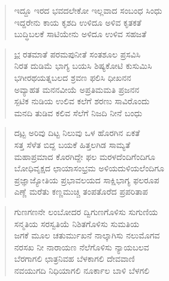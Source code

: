 {\begin{verse}
ಇದ್ದೂ ಇರದ ಭವದಲೇಕೋ ಇಲ್ಲವಾದ ಸಂಬಂಧ ಸಿಂಧು\\
ಇದ್ದರೇನು ಕಾಯ ಕೃಶದಿ ಉಳಿದೂ ಅಳಿವ ಕೃತಕತೆ\\
ಬುದ್ಧಿಬಲಕೆ ಸಾಟಿಯೇನು ಅಳಿದೂ ಉಳಿವ ಸಹಜತೆ
\end{verse}
\begin{verse}
\underline{ಭ} ರತಮಾತೆ ಪರಮಪುನೀತೆ ಸಂತಶೂಲ ಪ್ರಸವಿಸಿ\\
ನಿರತ ದುಡಿಮೆ ಭಾಗ್ಯ ಬಯಸಿ ಶಿಷ್ಯಕೋಟಿ ಕುಸುಮಿಸಿ\\
ಭಗೀರಥಯತ್ನಬಲದ ಶ್ರವಣ ಫಲಿಸಿ ಧೀಖನನ\\
ಅವ್ಯಾಹತ ಮನನವೀಯೆ ಅಪ್ರತಿಮಮತಿ ಪ್ರಜನನ\\
ಸ್ಪಟಿಕ ನುಡಿಯ ಉಲಿವ ಕಲೆಗೆ ಶರಣು ಸಾವಿರೊಂದು\\
ಮನದಿ ತುಡಿವ ಕಲಿವ ಸೆಲೆಗೆ ನಿಜದಿ ನೀನೆ ಬಂಧು
\end{verse}
\begin{verse}
ದ\underline{ಟ್ಟ} ಅರಿವು ದಿಟ್ಟ ನಿಲುವು ಒಳ  \enginline{-}  ಹೊರಗಿನ ಏಕತೆ\\
ಸತ್ತ ಸೆಳೆತ ಬಿದ್ದ ಬಯಕೆ ಹಿತ್ತಲಗಿಡ ಸಾಮ್ಯತೆ\\
ಮಹಾಪ್ರಮಾದ ಕೊರಗಿದ್ದೇ ಫಲ ಮರಳದೆಂದಿಗೆಂದಿಗೂ\\
ಬೋಧಿವೃಕ್ಷದ ಛಾಯಾಸಂಭ್ರಮ ಅಳಿಯದುಳಿಯಲೆಂದಿಗೂ\\
ಪ್ರಜ್ಞಾಜ್ಯೋತಿಯ ಪ್ರಭಾವಲಯದ ಸಾಕ್ಷಿಭಾಗ್ಯ ಫಲರೂಪ\\
ಎಣ್ಣೆ ಮರೆತು ಕಣ್ಣಮುಚ್ಚಿ ತಂಪತೊರೆದ ಪ್ರಪರಿತಾಪ
\end{verse}
\begin{verse}
ಗುಣಗಣನೇ ಲಂಬೋದರ ದ್ವಿಗುಣಗೊಳಿಸು ಸುಗುಣಿಯ\\
ಸನ್ಮತಿಯ ಸರಸ್ವತಿಯೆ ನಿಶಿತಗೊಳಿಸು ಸುಮತಿಯ\\
ಜಗಕೆ ಮೂಲ ಚತುರ್ಮುಖನೆ ನಾಲ್ಕಾಗಿಸು ನಲುಮೊಗವ\\
ನರಸಖ ನೀ ನಾರಾಯಣ ನೆಲೆಗೊಳಿಸು ನ್ಯಾಯಬಲವ\\
ಬೆರಗಾಗಲಿ ಛಾತ್ರನಿವಹ ಬೆಳಕಾಗಲಿ ದೇವವಾಣಿ\\
ನವಯುಗದಿ ನಿಧಿಯಾಗಲಿ ನೂರ್ಕಾಲ ಬಾಳಿ ಬೆಳಗಲಿ
\end{verse}
\articleend
}
